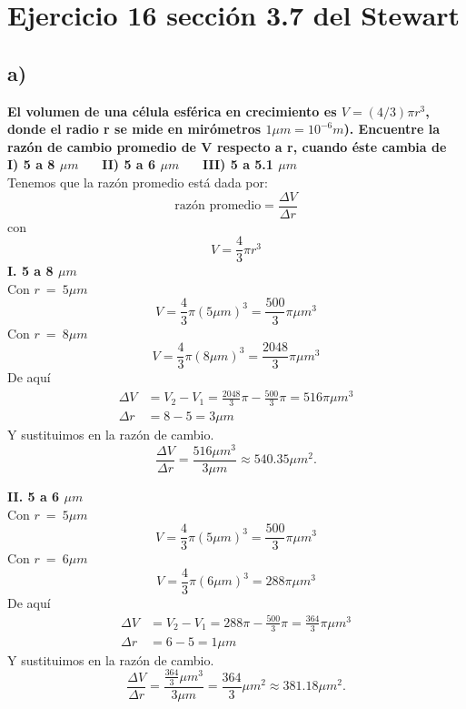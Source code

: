 \documentclass[11pt,letterpaper]{article}
\begin{document}
\section*{Ejercicio 16 sección 3.7 del Stewart}
\subsection*{a)}
\textbf{El volumen de una célula esférica en crecimiento es $V=(4/3) \pi r^3$, donde el radio r se mide en mirómetros $1\mu m = 10^{-6}m$). Encuentre la razón de cambio promedio de V respecto a r, cuando éste cambia de} \\
\textbf{I) 5 a 8 $\mu m$} \ \ \ \textbf{II) 5 a 6 $\mu m$} \ \ \ \textbf{III) 5 a 5.1 $\mu m$}\\
Tenemos que la razón promedio está dada por:
\begin{equation*}
  \text{razón promedio}=\frac{\Delta V}{\Delta r}
\end{equation*}
con
\begin{equation*}
  V=\frac{4}{3}\pi r^3
\end{equation*}
\textbf{I. 5 a 8 $\mu m$}\\
Con $r \ = \ 5\mu m$
\begin{equation*}
  V=\frac{4}{3}\pi (5\mu m)^3=\frac{500}{3}\pi\mu m ^3
\end{equation*}
Con $r \ = \ 8 \mu m $
\begin{equation*}
  V=\frac{4}{3}\pi (8\mu m)^3=\frac{2048}{3}\pi\mu m ^3
\end{equation*}
De aquí
\begin{equation*}
  \begin{split}
    \Delta V &= V_2-V_1=\frac{2048}{3}\pi-\frac{500}{3}\pi=516\pi \mu m^3 \\
    \Delta r &= 8-5 = 3 \mu m
  \end{split}
\end{equation*}
Y sustituimos en la razón de cambio.
\begin{equation*}
  \frac{\Delta V}{\Delta r}=\frac{516\mu m^3}{3 \mu m}\approx 540.35\mu m^2.
\end{equation*}

\textbf{II. 5 a 6 $\mu m$}\\
Con $r \ = \ 5\mu m$
\begin{equation*}
  V=\frac{4}{3}\pi (5\mu m)^3=\frac{500}{3}\pi\mu m ^3
\end{equation*}
Con $r \ = \ 6 \mu m $
\begin{equation*}
  V=\frac{4}{3}\pi (6\mu m)^3=288\pi\mu m ^3
\end{equation*}
De aquí
\begin{equation*}
  \begin{split}
    \Delta V &= V_2-V_1=288\pi-\frac{500}{3}\pi=\frac{364}{3}\pi \mu m^3 \\
    \Delta r &= 6-5 = 1 \mu m
  \end{split}
\end{equation*}
Y sustituimos en la razón de cambio.
\begin{equation*}
  \frac{\Delta V}{\Delta r}=\frac{\frac{364}{3}\mu m^3}{3 \mu m}=\frac{364}{3}\mu m^2\approx 381.18 \mu m^2.
\end{equation*}
\end{document}
